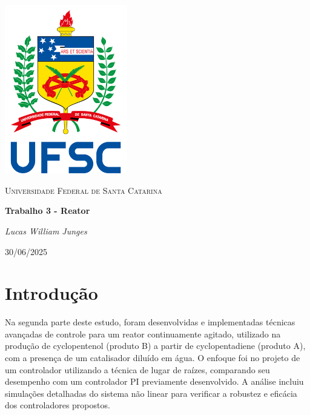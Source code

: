 \documentclass[a4paper,12pt]{article}
\newcommand{\reporttitle}{Trabalho 3 - Reator}
\newcommand{\reportauthor}{
Lucas William Junges}
\newcommand{\reportdate}{30/06/2025}
\begin{document}
\begin{titlepage}
    \centering
    \vspace*{1cm}
    \includegraphics[width=0.4\textwidth]{Imagens/BrasaoUFSC.png} %
    \par\vspace{1cm}
    {\scshape\Large Universidade Federal de Santa Catarina\par} %
    \vspace{1.2cm}
    {\huge\bfseries \reporttitle\par}
    \vspace{2cm}
    {\Large\itshape \reportauthor\par}
    \vfill
    {\large \reportdate\par}
\end{titlepage}

\listoffigures
\clearpage

\tableofcontents
\clearpage



\section{Introdução}

Na segunda parte deste estudo, foram desenvolvidas e implementadas técnicas avançadas de controle para um reator continuamente agitado, utilizado na produção de cyclopentenol (produto B) a partir de cyclopentadiene (produto A), com a presença de um catalisador diluído em água. O enfoque foi no projeto de um controlador utilizando a técnica de lugar de raízes, comparando seu desempenho com um controlador PI previamente desenvolvido. A análise incluiu simulações detalhadas do sistema não linear para verificar a robustez e eficácia dos controladores propostos.
\end{document}
